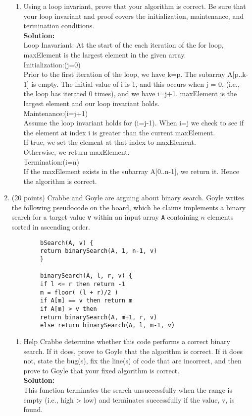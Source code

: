 \documentclass[12pt]{article}
\begin{document}
\begin{enumerate}
\begin{enumerate}
		\item Using a loop invariant, prove that your algorithm is correct. Be sure that your loop invariant and proof covers the initialization, maintenance, and termination conditions.\\
		{\bf{Solution:}}\\
		Loop Inavariant:
		At the start of the each iteration of the for loop, maxElement is the largest element in the given array. 
		\\
		Initialization:(j=0)\\
			Prior to the first iteration of the loop, we have k=p. The subarray A[p..k-1] is empty. 
			The initial value of i is 1, and this occurs when j = 0, (i.e., the loop has iterated 0 times), and we have i=j+1.
			maxElement is the largest element and our loop invariant holds.\\
		Maintenance:(i=j+1)\\
			Assume the loop invariant holds for (i=j-1). When i=j we check to see if the element at index i is greater than the current
			maxElement.\\
				If true, we set the element at that index to maxElement.\\
				Otherwise, we return maxElement.\\
		Termination:(i=n)\\
			If the maxElement exists in the subarray A[0..n-1], we return it. Hence the algorithm is correct.\\

		\end{enumerate}

		\newpage

		\item (20 points) Crabbe and Goyle are arguing about binary search. Goyle writes the following pseudocode on the board, which he claims implements a binary search for a target value {\tt v} within an input array {\tt A} containing $n$ elements sorted in ascending order.
		\begin{small}
		\begin{verbatim}
		bSearch(A, v) {
		return binarySearch(A, 1, n-1, v)
		}

		binarySearch(A, l, r, v) {
		if l <= r then return -1
		m = floor( (l + r)/2 )
		if A[m] == v then return m
		if A[m] > v then
		return binarySearch(A, m+1, r, v)
		else return binarySearch(A, l, m-1, v)
		\end{verbatim}
		\end{small}

		\begin{enumerate}
		\item Help Crabbe determine whether this code performs a correct binary search. If it does, prove to Goyle that the algorithm is correct. If it does not, state the bug(s), fix the line(s) of code that are incorrect, and then prove to Goyle that your fixed algorithm is correct.\\
		{\bf{Solution:}}\\
		This function terminates the search unsuccessfully when the range is empty (i.e., high > low) and terminates successfully 
		if the value, v, is found.\\


\end{enumerate}
\end{enumerate}
\end{document}
